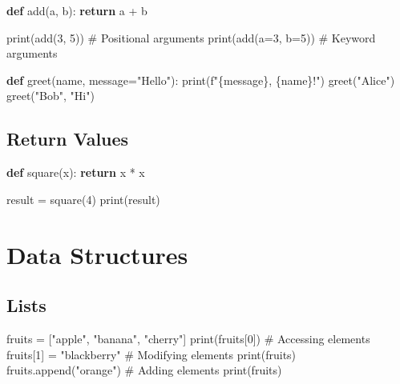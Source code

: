 \documentclass[
  letterpaper,
  DIV=11,
  numbers=noendperiod]{scrreprt}
\newenvironment{Shaded}{\begin{snugshade}}{\end{snugshade}}
\newcommand{\BuiltInTok}[1]{\textcolor[rgb]{0.00,0.23,0.31}{#1}}
\newcommand{\CommentTok}[1]{\textcolor[rgb]{0.37,0.37,0.37}{#1}}
\newcommand{\ControlFlowTok}[1]{\textcolor[rgb]{0.00,0.23,0.31}{\textbf{#1}}}
\newcommand{\DecValTok}[1]{\textcolor[rgb]{0.68,0.00,0.00}{#1}}
\newcommand{\KeywordTok}[1]{\textcolor[rgb]{0.00,0.23,0.31}{\textbf{#1}}}
\newcommand{\NormalTok}[1]{\textcolor[rgb]{0.00,0.23,0.31}{#1}}
\newcommand{\OperatorTok}[1]{\textcolor[rgb]{0.37,0.37,0.37}{#1}}
\newcommand{\SpecialCharTok}[1]{\textcolor[rgb]{0.37,0.37,0.37}{#1}}
\newcommand{\SpecialStringTok}[1]{\textcolor[rgb]{0.13,0.47,0.30}{#1}}
\newcommand{\StringTok}[1]{\textcolor[rgb]{0.13,0.47,0.30}{#1}}
\begin{document}
\begin{Shaded}
\begin{Highlighting}[]
\KeywordTok{def}\NormalTok{ add(a, b):}
    \ControlFlowTok{return}\NormalTok{ a }\OperatorTok{+}\NormalTok{ b}

\BuiltInTok{print}\NormalTok{(add(}\DecValTok{3}\NormalTok{, }\DecValTok{5}\NormalTok{))  }\CommentTok{\# Positional arguments}
\BuiltInTok{print}\NormalTok{(add(a}\OperatorTok{=}\DecValTok{3}\NormalTok{, b}\OperatorTok{=}\DecValTok{5}\NormalTok{))  }\CommentTok{\# Keyword arguments}

\KeywordTok{def}\NormalTok{ greet(name, message}\OperatorTok{=}\StringTok{"Hello"}\NormalTok{):}
    \BuiltInTok{print}\NormalTok{(}\SpecialStringTok{f"}\SpecialCharTok{\{}\NormalTok{message}\SpecialCharTok{\}}\SpecialStringTok{, }\SpecialCharTok{\{}\NormalTok{name}\SpecialCharTok{\}}\SpecialStringTok{!"}\NormalTok{)}
\NormalTok{greet(}\StringTok{"Alice"}\NormalTok{)}
\NormalTok{greet(}\StringTok{"Bob"}\NormalTok{, }\StringTok{"Hi"}\NormalTok{)}
\end{Highlighting}
\end{Shaded}

\subsection{Return Values}\label{return-values}

\begin{Shaded}
\begin{Highlighting}[]
\KeywordTok{def}\NormalTok{ square(x):}
    \ControlFlowTok{return}\NormalTok{ x }\OperatorTok{*}\NormalTok{ x}

\NormalTok{result }\OperatorTok{=}\NormalTok{ square(}\DecValTok{4}\NormalTok{)}
\BuiltInTok{print}\NormalTok{(result)}
\end{Highlighting}
\end{Shaded}

\section{Data Structures}\label{data-structures}

\subsection{Lists}\label{lists-1}

\begin{Shaded}
\begin{Highlighting}[]
\NormalTok{fruits }\OperatorTok{=}\NormalTok{ [}\StringTok{"apple"}\NormalTok{, }\StringTok{"banana"}\NormalTok{, }\StringTok{"cherry"}\NormalTok{]}
\BuiltInTok{print}\NormalTok{(fruits[}\DecValTok{0}\NormalTok{])  }\CommentTok{\# Accessing elements}
\NormalTok{fruits[}\DecValTok{1}\NormalTok{] }\OperatorTok{=} \StringTok{"blackberry"}  \CommentTok{\# Modifying elements}
\BuiltInTok{print}\NormalTok{(fruits)}
\NormalTok{fruits.append(}\StringTok{"orange"}\NormalTok{)  }\CommentTok{\# Adding elements}
\BuiltInTok{print}\NormalTok{(fruits)}
\end{Highlighting}
\end{Shaded}
\end{document}
